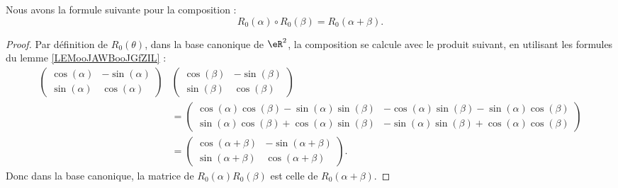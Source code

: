 \begin{proposition}     \label{PROPooISUCooRYJcwo}
    Nous avons la formule suivante pour la composition :
    \begin{equation}
        R_0(\alpha)\circ R_0(\beta)=R_0(\alpha+\beta).
    \end{equation}
\end{proposition}

\begin{proof}
    Par définition de \( R_0(\theta)\), dans la base canonique de \( \eR^2\), la composition se calcule avec le produit suivant, en utilisant les formules du lemme \ref{LEMooJAWBooJGfZIL} :
    \begin{subequations}
        \begin{align}
            \begin{pmatrix}
                \cos(\alpha)    &   -\sin(\alpha)    \\ 
                \sin(\alpha)    &   \cos(\alpha)    
            \end{pmatrix}&\begin{pmatrix}
                \cos(\beta)    &   -\sin(\beta)    \\ 
                \sin(\beta)    &   \cos(\beta)    
            \end{pmatrix}\\
            &=\begin{pmatrix}
                \cos(\alpha)\cos(\beta)  -\sin(\alpha)\sin(\beta)  &  -\cos(\alpha)\sin(\beta)-\sin(\alpha)\cos(\beta)     \\ 
                \sin(\alpha)\cos(\beta)+\cos(\alpha)\sin(\beta)    &   -\sin(\alpha)\sin(\beta)+\cos(\alpha)\cos(\beta)    
            \end{pmatrix}\\
            &=\begin{pmatrix}
                \cos(\alpha+\beta)    &   -\sin(\alpha+\beta)    \\ 
                \sin(\alpha+\beta)    &   \cos(\alpha+\beta)    
            \end{pmatrix}.
        \end{align}
    \end{subequations}
    Donc dans la base canonique, la matrice de \( R_0(\alpha)R_0(\beta)\) est celle de \( R_0(\alpha+\beta)\).
\end{proof}

